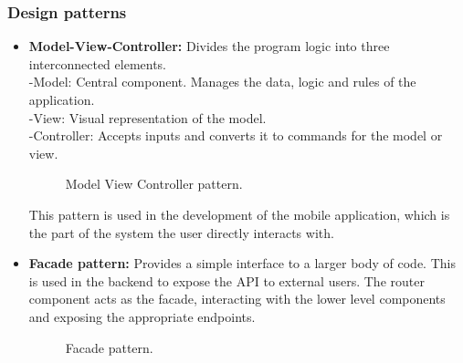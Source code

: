 \subsubsection{Design patterns}
\begin{itemize}
    \item
    \textbf{Model-View-Controller:} Divides the program logic into three interconnected elements.\\
        \hspace*{3ex}-\hspace*{2ex}Model: Central component. Manages the data, logic and rules of the application.\\
        \hspace*{3ex}-\hspace*{2ex}View: Visual representation of the model.\\
        \hspace*{3ex}-\hspace*{2ex}Controller: Accepts inputs and converts it to commands for the model or view.

    \begin{figure}[H]
    \centering
    \caption{\label{fig:api-usage}Model View Controller pattern.}
    \end{figure}

    This pattern is used in the development of the mobile application, which is the part of the system the user directly interacts with.

    \item
    \textbf{Facade pattern:} Provides a simple interface to a larger body of code. This is used in the backend to expose the API to external users. The router component acts as the facade, interacting with the lower level components and exposing the appropriate endpoints.

    \begin{figure}[H]
    \centering
    \caption{\label{fig:api-usage}Facade pattern.}
    \end{figure}


\end{itemize}
